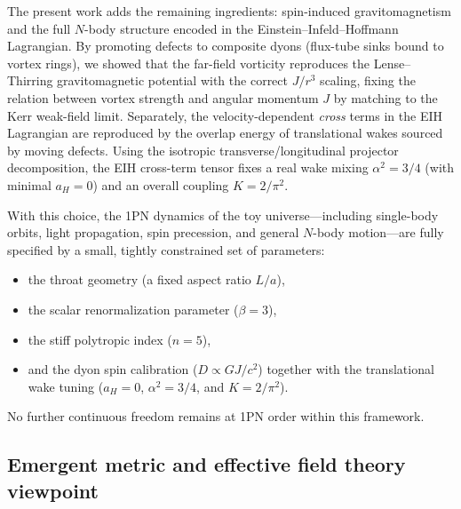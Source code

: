 \documentclass[11pt]{article}
\begin{document}
The present work adds the remaining ingredients: spin-induced
gravitomagnetism and the full $N$-body structure encoded in the
Einstein--Infeld--Hoffmann Lagrangian.
By promoting defects to composite dyons (flux-tube sinks bound to vortex rings),
we showed that the far-field vorticity reproduces the Lense--Thirring
gravitomagnetic potential with the correct $J/r^3$ scaling, fixing the
relation between vortex strength and angular momentum $J$ by matching to the
Kerr weak-field limit.
Separately, the velocity-dependent \emph{cross} terms in the EIH Lagrangian are
reproduced by the overlap energy of translational wakes sourced by moving
defects.  Using the isotropic transverse/longitudinal projector decomposition,
the EIH cross-term tensor fixes a real wake mixing $\alpha^2=3/4$ (with minimal
$a_H=0$) and an overall coupling $K=2/\pi^2$.

With this choice, the 1PN dynamics of the toy universe---including
single-body orbits, light propagation, spin precession, and general
$N$-body motion---are fully specified by a small, tightly constrained
set of parameters:
\begin{itemize}
  \item the throat geometry (a fixed aspect ratio $L/a$),
\item the scalar renormalization parameter ($\beta=3$),
  \item the stiff polytropic index ($n=5$),
  \item and the dyon spin calibration ($D\propto GJ/c^2$) together
        with the translational wake tuning ($a_H=0$, $\alpha^2=3/4$, and $K=2/\pi^2$).
\end{itemize}
No further continuous freedom remains at 1PN order within this
framework.

\subsection{Emergent metric and effective field theory viewpoint}
\label{subsec:discussion-eft}
\end{document}
